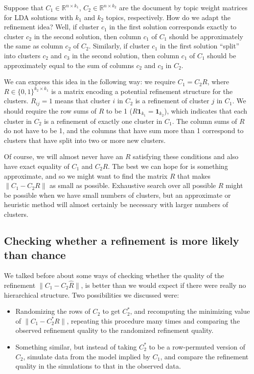 \documentclass[11pt]{article}
\newcommand{\R}{\mathbb R}
\begin{document}
Suppose that $C_1 \in \R^{n \times k_1}$, $C_2 \in \R^{n \times k_2}$ are the document by topic weight matrices for LDA solutions with $k_1$ and $k_2$ topics, respectively.
How do we adapt the refinement idea?
Well, if cluster $c_1$ in the first solution corresponds exactly to cluster $c_2$ in the second solution, then column $c_1$ of $C_1$ should be approximately the same as column $c_2$ of $C_2$.
Similarly, if cluster $c_1$ in the first solution ``split'' into clusters $c_2$ and $c_3$ in the second solution, then column $c_1$ of $C_1$ should be approximately equal to the sum of columns $c_2$ and $c_3$ in $C_2$.

We can express this idea in the following way: we require $C_1 = C_2 R$, where $R \in \{0,1\}^{k_2 \times k_1}$ is a matrix encoding a potential refinement structure for the clusters.
$R_{ij} = 1$ means that cluster $i$ in $C_2$ is a refinement of cluster $j$ in $C_1$.
We should require the row sums of $R$ to be 1 ($R \mathbf 1_{k_1} = \mathbf 1_{k_2}$), which indicates that each cluster in $C_2$ is a refinement of exactly one cluster in $C_1$.
The column sums of $R$ do not have to be 1, and the columns that have sum more than 1 correspond to clusters that have split into two or more new clusters.

Of course, we will almost never have an $R$ satisfying these conditions and also have exact equality of $C_1$ and $C_2 R$.
The best we can hope for is something approximate, and so we might want to find the matrix $R$ that makes $\|C_1 - C_2 R\|$ as small as possible.
Exhaustive search over all possible $R$ might be possible when we have small numbers of clusters, but an approximate or heuristic method will almost certainly be necessary with larger numbers of clusters.

\subsection*{Checking whether a refinement is more likely than chance}

We talked before about some ways of checking whether the quality of the refinement $\|C_1 - C_2 \hat R\|$, is better than we would expect if there were really no hierarchical structure.
Two possibilities we discussed were:
\begin{itemize}
\item Randomizing the rows of $C_2$ to get $C_2^*$, and recomputing the minimizing value of $\|C_1 - C_2^* R\|$, repeating this procedure many times and comparing the observed refinement quality to the randomized refinement quality.
\item Something similar, but instead of taking $C_2^*$ to be a row-permuted version of $C_2$, simulate data from the model implied by $C_1$, and compare the refinement quality in the simulations to that in the observed data.
\end{itemize}
\end{document}
